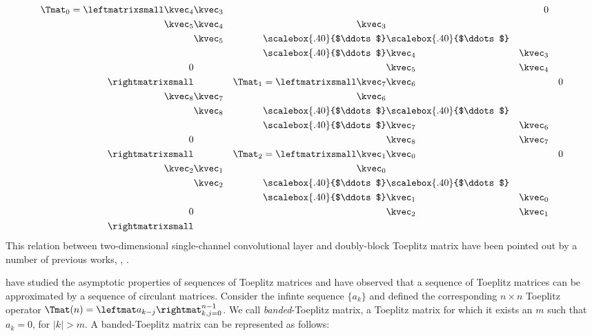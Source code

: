 \begin{align}
  \Tmat_0 = \leftmatrixsmall
    \kvec_{4} & \kvec_{3} &  &  &  0 \\
    \kvec_{5} & \kvec_{4} & \kvec_{3} &  &   \\
     & \kvec_{5} & \scalebox{.40}{$\ddots$} & \scalebox{.40}{$\ddots$}  \\
     &  &  \scalebox{.40}{$\ddots$} & \kvec_{4} & \kvec_{3}  \\
    0 &  &  & \kvec_{5} & \kvec_{4}  \\
  \rightmatrixsmall &&
  \Tmat_{1} = \leftmatrixsmall
    \kvec_{7} & \kvec_{6} &  &  &  0 \\
    \kvec_{8} & \kvec_{7} & \kvec_{6} &  &   \\
     & \kvec_{8} & \scalebox{.40}{$\ddots$} & \scalebox{.40}{$\ddots$} &    \\
     &  &  \scalebox{.40}{$\ddots$} & \kvec_{7} & \kvec_{6}  \\
    0 &  &  & \kvec_{8} & \kvec_{7}  \\
  \rightmatrixsmall &&
  \Tmat_{2} = \leftmatrixsmall
    \kvec_{1} & \kvec_{0} &  &  &  0 \\
    \kvec_{2} & \kvec_{1} & \kvec_{0} &  &   \\
     & \kvec_{2} & \scalebox{.40}{$\ddots$} & \scalebox{.40}{$\ddots$} &    \\
     &  &  \scalebox{.40}{$\ddots$} & \kvec_{1} & \kvec_{0}  \\
    0 &  &  & \kvec_{2} & \kvec_{1}  \\
  \rightmatrixsmall
\end{align}
This relation between two-dimensional single-channel convolutional layer and doubly-block Toeplitz matrix have been pointed out by a number of previous works, \eg, \citet{goodfellow2016deep,wang2020orthogonal,appuswamy2016structured}.

%



\citet{gray2006toeplitz} have studied the asymptotic properties of sequences of Toeplitz matrices and have observed that a sequence of Toeplitz matrices can be approximated by a sequence of circulant matrices.
Consider the infinte sequence $\{a_k\}$ and defined the corresponding $n \times n$ Toeplitz operator $\Tmat(n) = \leftmat a_{k-j} \rightmat_{k,j = 0}^{n-1}$.
We call \emph{banded}-Toeplitz matrix, a Toeplitz matrix for which it exists an $m$ such that $a_k = 0$, for $|k| > m$.
A banded-Toeplitz matrix can be represented as follows:


